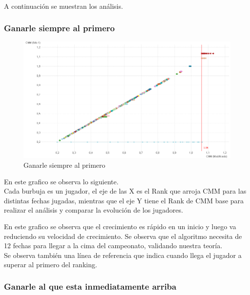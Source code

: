 A continuación se muestran los análisis.

\subsubsection{Ganarle siempre al primero}

\begin{figure}[H]
    \centering
    \includegraphics[width=1\textwidth]{IMG/estrategia 5.png}
    \caption{Ganarle siempre al primero}
    \label{fig: Ganarle siempre al primero}
\end{figure}

En este grafico se observa lo siguiente.\\
Cada burbuja es un jugador, el eje de las X es el Rank que arroja CMM para las distintas fechas jugadas, mientras que el eje Y tiene el Rank de CMM base para
realizar el análisis y comparar la evolución de los jugadores.

En este grafico se observa que el crecimiento es rápido en un inicio y luego va reduciendo su velocidad de crecimiento.
Se observa que el algoritmo necesita de 12 fechas para llegar a la cima del campeonato, validando nuestra teoría.\\

Se observa también una línea de referencia que indica cuando llega el jugador a superar al primero del ranking.\\

\subsubsection{Ganarle al que esta inmediatamente arriba}
\\

